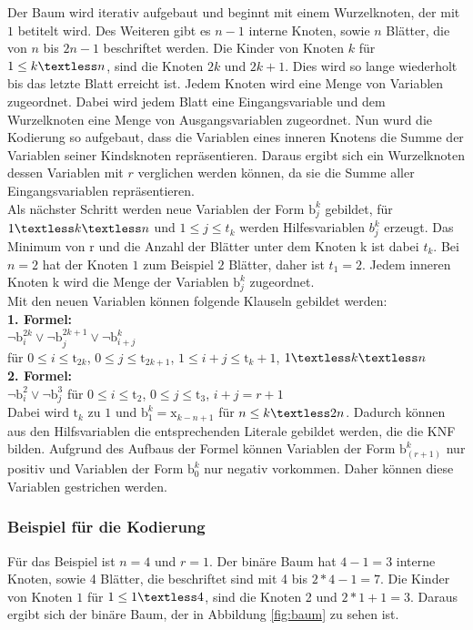 \documentclass[a4,abstract=on]{scrartcl}
\begin{document}
Der Baum wird iterativ aufgebaut und beginnt mit einem Wurzelknoten, der mit $1$ betitelt wird. Des Weiteren gibt es $n-1$ interne Knoten, sowie $n$ Blätter, die von $n$ bis $2n-1$ beschriftet werden. Die Kinder von Knoten $k$  für $1 \leq k \textless n$, sind die Knoten $2k$ und $2k +1$. Dies wird so lange wiederholt bis das letzte Blatt erreicht ist.
Jedem Knoten wird eine Menge von Variablen zugeordnet. Dabei wird jedem Blatt eine Eingangsvariable und dem Wurzelknoten eine Menge von Ausgangsvariablen zugeordnet. Nun wurd die Kodierung so aufgebaut, dass die Variablen eines inneren Knotens die Summe der Variablen seiner Kindsknoten repräsentieren. Daraus ergibt sich ein Wurzelknoten dessen Variablen mit $r$ verglichen werden können, da sie die Summe aller Eingangsvariablen repräsentieren.\\

Als nächster Schritt werden neue Variablen der Form $\text{b}_j^k$ gebildet, für $1 \textless k \textless n$ und  $1 \leq j \leq t_k$ werden Hilfesvariablen $ b_j^k$ erzeugt. Das Minimum von r und die Anzahl der Blätter unter dem Knoten k ist dabei $t_k$. Bei $n=2$ hat der Knoten $1$ zum Beispiel $2$ Blätter, daher ist $t_1=2$. Jedem inneren Knoten k wird die Menge der Variablen $\text{b}_j^k$ zugeordnet.\\
Mit den neuen Variablen können folgende Klauseln gebildet werden:\\
\textbf{1. Formel:}\\
$ \neg \text{b}_i^{2k} \vee \neg \text{b}_j^{2k+1} \vee \neg \text{b}_{i+j}^{k}$ \\
für $0\leq i \leq \text{t}_{2k}$, $0\leq j \leq \text{t}_{2k+1}$, $1\leq i+j \leq \text{t}_{k}+1$, $1\textless k \textless n$\\
\textbf{2. Formel:}\\
$ \neg \text{b}_i^2 \vee \neg \text{b}_j^3$ für $0\leq i \leq \text{t}_2$, $0\leq j \leq \text{t}_3$, $i+j = r+1$\\

Dabei wird $\text{t}_k$ zu $1$ und $\text{b}_1^k = \text{x}_{k-n+1}$ für $n \leq k \textless 2n$. Dadurch können aus den Hilfsvariablen die entsprechenden Literale gebildet werden, die die KNF bilden.
Aufgrund des Aufbaus der Formel können Variablen der Form $\text{b}_(r+1)^k$ nur positiv und Variablen der Form $\text{b}_0^k$ nur negativ vorkommen. Daher können diese Variablen gestrichen werden.

\subsubsection{Beispiel für die Kodierung}
Für das Beispiel ist $n=4$ und $r =1$. Der binäre Baum hat $4-1 = 3$ interne Knoten, sowie 4 Blätter, die beschriftet sind mit 4 bis $2*4-1=7$. Die Kinder von Knoten $1$  für $1 \leq 1 \textless 4$, sind die Knoten 2 und $2*1 +1=3$. Daraus ergibt sich der binäre Baum, der in Abbildung \ref{fig:baum} zu sehen ist.
\end{document}
